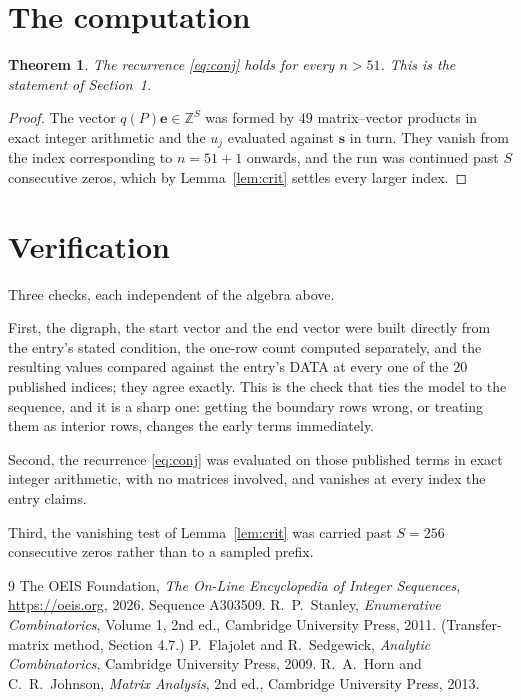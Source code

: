 \documentclass[11pt,a4paper]{article}
\theoremstyle{plain}
\newtheorem{theorem}{Theorem}
\theoremstyle{definition}
\begin{document}
\section{The computation}

\begin{theorem}
The recurrence \eqref{eq:conj} holds for every $n>51$. This is the statement of
Section~1.
\end{theorem}

\begin{proof}
The vector $q(P)\mathbf{e}\in\mathbb{Z}^{S}$ was formed by $49$ matrix--vector
products in exact integer arithmetic and the $u_j$ evaluated against $\mathbf{s}$ in turn.
They vanish from the index corresponding to $n=51+1$ onwards, and the run was continued
past $S$ consecutive zeros, which by Lemma~\ref{lem:crit} settles every larger index.
\end{proof}

\section{Verification}

Three checks, each independent of the algebra above.

First, the digraph, the start vector and the end vector were built directly from the
entry's stated condition, the one-row count computed separately, and the resulting values
compared against the entry's DATA at every one of the $20$ published indices; they
agree exactly. This is the check that ties the model to the sequence, and it is a sharp one:
getting the boundary rows wrong, or treating them as interior rows, changes the early terms
immediately.

Second, the recurrence \eqref{eq:conj} was evaluated on those published terms in exact
integer arithmetic, with no matrices involved, and vanishes at every index the entry claims.

Third, the vanishing test of Lemma~\ref{lem:crit} was carried past $S=256$ consecutive
zeros rather than to a sampled prefix.

\begin{thebibliography}{9}
 The OEIS Foundation, \emph{The On-Line Encyclopedia of Integer
Sequences}, \url{https://oeis.org}, 2026. Sequence A303509.
 R.~P.~Stanley, \emph{Enumerative Combinatorics}, Volume 1, 2nd ed.,
Cambridge University Press, 2011. (Transfer-matrix method, Section 4.7.)
 P.~Flajolet and R.~Sedgewick, \emph{Analytic Combinatorics}, Cambridge
University Press, 2009.
 R.~A.~Horn and C.~R.~Johnson, \emph{Matrix Analysis}, 2nd ed., Cambridge
University Press, 2013.
\end{thebibliography}
\end{document}
